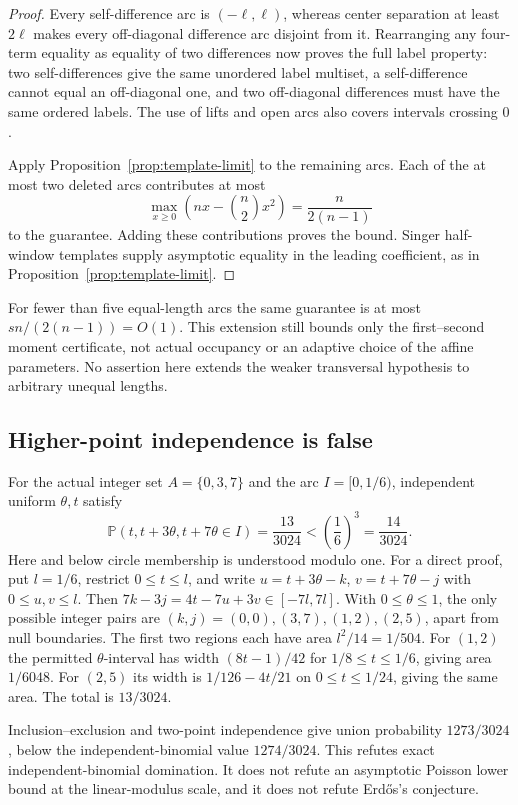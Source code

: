 \documentclass[11pt]{article}
\theoremstyle{definition}
\theoremstyle{remark}
\newcommand{\Prob}{\mathbb P}
\begin{document}
\begin{proof}
Every self-difference arc is $(-\ell,\ell)$, whereas center separation
at least $2\ell$ makes every off-diagonal difference arc disjoint from
it. Rearranging any four-term equality as equality of two differences
now proves the full label property: two self-differences give the same
unordered label multiset, a self-difference cannot equal an off-diagonal
one, and two off-diagonal differences must have the same ordered labels.
The use of lifts and open arcs also covers intervals crossing $0$.

Apply Proposition~\ref{prop:template-limit} to the remaining arcs.
Each of the at most two deleted arcs contributes at most
\[
\max_{x\ge0}\left(nx-\binom n2x^2\right)
=\frac{n}{2(n-1)}
\]
to the guarantee. Adding these contributions proves the bound.
Singer half-window templates supply asymptotic equality in the leading
coefficient, as in Proposition~\ref{prop:template-limit}.
\end{proof}

For fewer than five equal-length arcs the same guarantee is at most
$sn/(2(n-1))=O(1)$. This extension still bounds only the first--second
moment certificate, not actual occupancy or an adaptive choice of the
affine parameters. No assertion here extends the weaker transversal
hypothesis to arbitrary unequal lengths.

\subsection{Higher-point independence is false}

For the actual integer set $A=\{0,3,7\}$ and the arc $I=[0,1/6)$,
independent uniform $\theta,t$ satisfy
\begin{equation}\label{eq:negative-triple}
\Prob(t,t+3\theta,t+7\theta\in I)=\frac{13}{3024}
<\left(\frac16\right)^3=\frac{14}{3024}.
\end{equation}
Here and below circle membership is understood modulo one.
For a direct proof, put $l=1/6$, restrict $0\le t\le l$, and write
$u=t+3\theta-k$, $v=t+7\theta-j$ with $0\le u,v\le l$.
Then $7k-3j=4t-7u+3v\in[-7l,7l]$.
With $0\le\theta\le1$, the only possible integer pairs are
$(k,j)=(0,0),(3,7),(1,2),(2,5)$, apart from null boundaries.
The first two regions each have area $l^2/14=1/504$.
For $(1,2)$ the permitted $\theta$-interval has width $(8t-1)/42$
for $1/8\le t\le1/6$, giving area $1/6048$.
For $(2,5)$ its width is $1/126-4t/21$ on $0\le t\le1/24$,
giving the same area. The total is $13/3024$.

Inclusion--exclusion and two-point independence give union probability
$1273/3024$, below the independent-binomial value $1274/3024$.
This refutes exact independent-binomial domination. It does not refute
an asymptotic Poisson lower bound at the linear-modulus scale, and it
does not refute Erd\H{o}s's conjecture.
\end{document}
